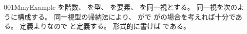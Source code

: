 \documentclass[index]{subfiles}
\begin{document}
\begin{myBlock}{001M}{myExample}
  を階数、
  を型、
  を要素、
  を同一視とする。
  同一視を次のように構成する。
  同一視型の帰納法により、
  がで
  がの場合を考えれば十分である。
  定義よりなので
  と定義する。
  形式的に書けば
  である。
\end{myBlock}
\end{document}
